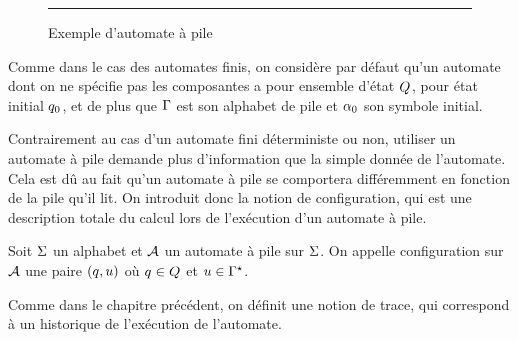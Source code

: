 \begin{figure}[t]
  \centering

  \vspace{0.2cm}
  \hrule

  \vspace{0.2cm}
  \caption{Exemple d'automate à pile}
  \label{fig.auto.pile1}
\end{figure}

\begin{notation}
  Comme dans le cas des automates finis, on considère par défaut qu'un automate
  dont on ne spécifie pas les composantes a pour ensemble d'état $Q_{}$, pour
  état initial $q_{0}$, et de plus que $\Gamma$ est son alphabet de pile et
  $\alpha_0$ son symbole initial.
\end{notation}

Contrairement au cas d'un automate fini déterministe ou non, utiliser un
automate à pile demande plus d'information que la simple donnée de l'automate.
Cela est dû au fait qu'un automate à pile se comportera différemment en fonction
de la pile qu'il lit. On introduit donc la notion de configuration, qui est une
description totale du calcul lors de l'exécution d'un automate à pile.

\begin{definition}[Configuration]
  Soit $\Sigma$ un alphabet et $\mathcal{A}$ un automate à pile sur $\Sigma$. On appelle
  configuration sur $\mathcal{A}$ une paire $(q_{},u)$ où $q_{} \in Q_{}$
  et $u \in \Gamma^{\star}$.
\end{definition}

Comme dans le chapitre précédent, on définit une notion de trace, qui correspond
à un historique de l'exécution de l'automate.

